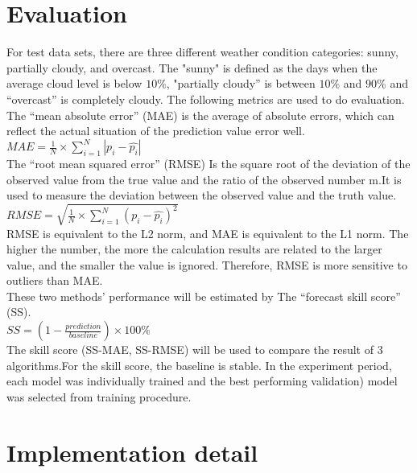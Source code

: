 \documentclass{elegantpaper}
\begin{document}
\section{Evaluation}
For  test data sets, there are three different weather condition categories: sunny, partially cloudy, and overcast. The "sunny" is defined as the days when the average cloud level is below $10\%$, "partially cloudy” is between $10\%$ and $90\%$ and “overcast” is completely cloudy. The following metrics are used to do evaluation.\\[2ex]
The “mean absolute error” (MAE) is the average of absolute errors, which can reflect the actual situation of the prediction value error well.\\[1.5ex]

$MAE=\frac{1}{N}\times\sum_{i=1}^{N}\left | p_{i}-\widehat{p_{i}} \right |$ \\[1.5ex]

The “root mean squared error” (RMSE) Is the square root of the deviation of the observed value from the true value and the ratio of the observed number m.It is used to measure the deviation between the observed value and the truth value. \\[1.5ex]

$RMSE=\sqrt{\frac{1}{N}\times\sum_{i=1}^{N} (p_{i}-\widehat{p_{i}})^{2}}$ \\[1.5ex]


RMSE is equivalent to the L2 norm, and MAE is equivalent to the L1 norm. The higher the number, the more the calculation results are related to the larger value, and the smaller the value is ignored. Therefore, RMSE is more sensitive to outliers than MAE. \\[1.5ex]

These two methods' performance will be estimated by The “forecast skill score” (SS).\\
$SS=\left ( 1-\frac{prediction}{baseline} \right )\times100\%$ \\[1.5ex]

The skill score (SS-MAE, SS-RMSE) will be used to compare the result of 3 algorithms.For the skill score, the baseline is stable. In the experiment period, each model was individually trained and the best performing validation) model  was selected from training procedure.




\section{Implementation detail}
\end{document}
